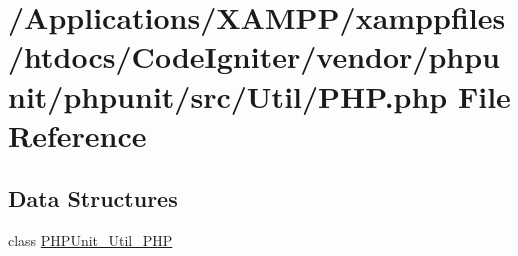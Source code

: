 \hypertarget{phpunit_2src_2_util_2_p_h_p_8php}{}\section{/\+Applications/\+X\+A\+M\+P\+P/xamppfiles/htdocs/\+Code\+Igniter/vendor/phpunit/phpunit/src/\+Util/\+P\+HP.php File Reference}
\label{phpunit_2src_2_util_2_p_h_p_8php}
\subsection*{Data Structures}
\begin{DoxyCompactItemize}
\item 
class \mbox{\hyperlink{class_p_h_p_unit___util___p_h_p}{P\+H\+P\+Unit\+\_\+\+Util\+\_\+\+P\+HP}}
\end{DoxyCompactItemize}
